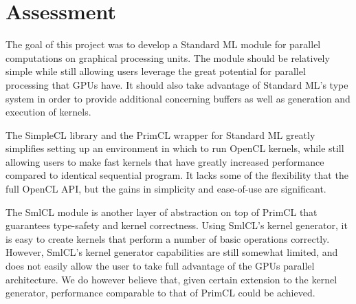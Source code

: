 \section{Assessment}

The goal of this project was to develop a Standard ML module for
parallel computations on graphical processing units. The module should
be relatively simple while still allowing users leverage the great
potential for parallel processing that GPUs have. It should also take
advantage of Standard ML's type system in order to provide additional
concerning buffers as well as generation and execution of kernels. 

The SimpleCL library and the PrimCL wrapper for Standard ML greatly
simplifies setting up an environment in which to run OpenCL kernels,
while still allowing users to make fast kernels that have greatly
increased performance compared to identical sequential program. It
lacks some of the flexibility that the full OpenCL API, but the gains
in simplicity and ease-of-use are significant.

The SmlCL module is another layer of abstraction on top of PrimCL that
guarantees type-safety and kernel correctness. Using SmlCL's kernel
generator, it is easy to create kernels that perform a number of basic
operations correctly. However, SmlCL's kernel generator capabilities
are still somewhat limited, and does not easily allow the user to take
full advantage of the GPUs parallel architecture. We do however
believe that, given certain extension to the kernel generator,
performance comparable to that of PrimCL could be achieved.
